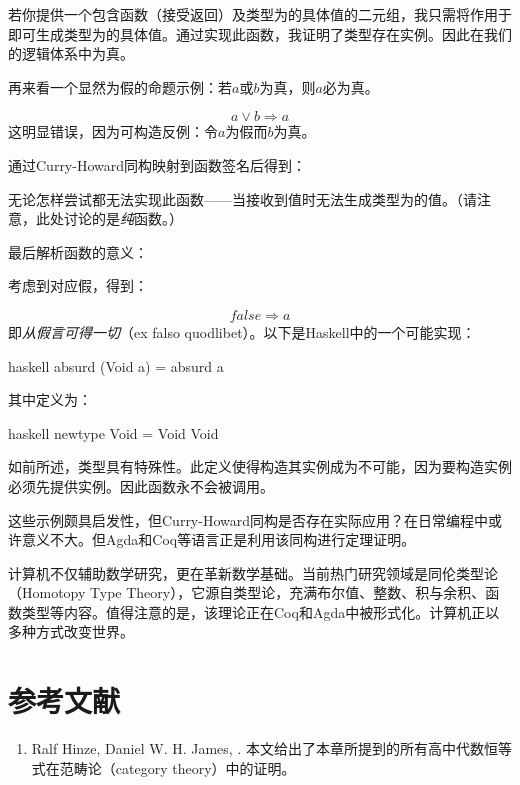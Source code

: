 若你提供一个包含函数（接受返回）及类型为的具体值的二元组，我只需将作用于即可生成类型为的具体值。通过实现此函数，我证明了类型存在实例。因此在我们的逻辑体系中为真。

再来看一个显然为假的命题示例：若$a$或$b$为真，则$a$必为真。

$$a \vee b \Rightarrow a$$
这明显错误，因为可构造反例：令$a$为假而$b$为真。

通过Curry-Howard同构映射到函数签名后得到：

无论怎样尝试都无法实现此函数——当接收到值时无法生成类型为的值。（请注意，此处讨论的是\emph{纯}函数。）

最后解析函数的意义：

考虑到对应假，得到：

$$\mathit{false} \Rightarrow a$$
即\emph{从假言可得一切}（ex falso quodlibet）。以下是Haskell中的一个可能实现：

\begin{snip}{haskell}
absurd (Void a) = absurd a
\end{snip}
其中定义为：

\begin{snip}{haskell}
newtype Void = Void Void
\end{snip}
如前所述，类型具有特殊性。此定义使得构造其实例成为不可能，因为要构造实例必须先提供实例。因此函数永不会被调用。

这些示例颇具启发性，但Curry-Howard同构是否存在实际应用？在日常编程中或许意义不大。但Agda和Coq等语言正是利用该同构进行定理证明。

计算机不仅辅助数学研究，更在革新数学基础。当前热门研究领域是同伦类型论（Homotopy Type Theory），它源自类型论，充满布尔值、整数、积与余积、函数类型等内容。值得注意的是，该理论正在Coq和Agda中被形式化。计算机正以多种方式改变世界。

\section{参考文献}

\begin{enumerate}
  \tightlist
  \item
        Ralf Hinze, Daniel W. H. James,
        . 本文给出了本章所提到的所有高中代数恒等式在范畴论（category theory）中的证明。
\end{enumerate}